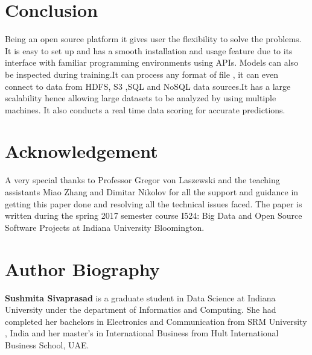 \documentclass[9pt,twocolumn,twoside]{../../styles/osajnl}
\begin{document}
\section{Conclusion}
Being an open source platform it gives user the flexibility to solve
the problems. It is easy to set up and has a smooth installation and
usage feature due to its interface with familiar programming
environments using APIs\cite{www-h2o-why}. Models can also be
inspected during training.It can process any format of file , it can
even connect to data from HDFS, S3 ,SQL and NoSQL data
sources\cite{www-h2o-why}.It has a large scalability hence allowing
large datasets to be analyzed by using multiple machines. It also
conducts a real time data scoring for accurate
predictions\cite{www-h2o-why}.

\section{Acknowledgement}
A very special thanks to Professor Gregor von Laszewski and the
teaching assistants Miao Zhang and Dimitar Nikolov for all the support
and guidance in getting this paper done and resolving all the
technical issues faced. The paper is written during the spring 2017
semester course {I524: Big Data and Open Source Software Projects} at
Indiana University Bloomington.

\section{Author Biography}
\textbf{Sushmita Sivaprasad} is a graduate student in Data Science at
Indiana University under the department of Informatics and
Computing. She had completed her bachelors in Electronics and
Communication from SRM University , India and her master's in
International Business from Hult International Business School, UAE.


\end{document}
